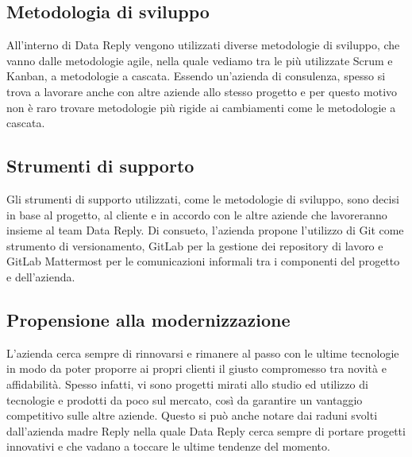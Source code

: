 \subsection{Metodologia di sviluppo}
All'interno di Data Reply vengono utilizzati diverse metodologie di sviluppo, che vanno dalle metodologie agile, nella quale vediamo tra le più utilizzate Scrum e Kanban, a metodologie a cascata. Essendo un'azienda di consulenza, spesso si trova a lavorare anche con altre aziende allo stesso progetto e per questo motivo non è raro trovare metodologie più rigide ai cambiamenti come le metodologie a cascata.
\subsection{Strumenti di supporto}
Gli strumenti di supporto utilizzati, come le metodologie di sviluppo,  sono decisi in base al progetto, al cliente e in accordo con le altre aziende che lavoreranno insieme al team Data Reply.
Di consueto, l'azienda propone l'utilizzo di Git come strumento di versionamento, GitLab per la gestione dei repository di lavoro e GitLab Mattermost per le comunicazioni informali tra i componenti del progetto e dell'azienda.
\subsection{Propensione alla modernizzazione}
L'azienda cerca sempre di rinnovarsi e rimanere al passo con le ultime tecnologie in modo da poter proporre ai propri clienti il giusto compromesso tra novità e affidabilità. Spesso infatti, vi sono progetti mirati allo studio ed utilizzo di tecnologie e prodotti da poco sul mercato, così da garantire un vantaggio competitivo sulle altre aziende.
Questo si può anche notare dai raduni svolti dall'azienda madre Reply nella quale Data Reply cerca sempre di portare progetti innovativi e che vadano a toccare le ultime tendenze del momento.
